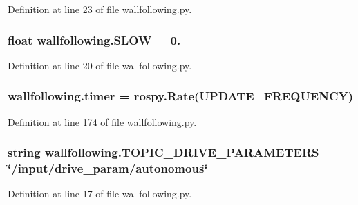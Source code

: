 Definition at line 23 of file wallfollowing.\+py.

\subsubsection[{\texorpdfstring{S\+L\+OW}{SLOW}}]{\setlength{\rightskip}{0pt plus 5cm}float wallfollowing.\+S\+L\+OW = 0.}\hypertarget{namespacewallfollowing_a30a4013dbd3a6ea5275fbed3fe35da22}{}\label{namespacewallfollowing_a30a4013dbd3a6ea5275fbed3fe35da22}


Definition at line 20 of file wallfollowing.\+py.

\subsubsection[{\texorpdfstring{timer}{timer}}]{\setlength{\rightskip}{0pt plus 5cm}wallfollowing.\+timer = rospy.\+Rate({\bf U\+P\+D\+A\+T\+E\+\_\+\+F\+R\+E\+Q\+U\+E\+N\+CY})}\hypertarget{namespacewallfollowing_a57288dd797e0bd15012f3ebf1670ce38}{}\label{namespacewallfollowing_a57288dd797e0bd15012f3ebf1670ce38}


Definition at line 174 of file wallfollowing.\+py.

\subsubsection[{\texorpdfstring{T\+O\+P\+I\+C\+\_\+\+D\+R\+I\+V\+E\+\_\+\+P\+A\+R\+A\+M\+E\+T\+E\+RS}{TOPIC_DRIVE_PARAMETERS}}]{\setlength{\rightskip}{0pt plus 5cm}string wallfollowing.\+T\+O\+P\+I\+C\+\_\+\+D\+R\+I\+V\+E\+\_\+\+P\+A\+R\+A\+M\+E\+T\+E\+RS = \char`\"{}/input/drive\+\_\+param/autonomous\char`\"{}}\hypertarget{namespacewallfollowing_a765ce45df7d0c3d9134fc83534029e36}{}\label{namespacewallfollowing_a765ce45df7d0c3d9134fc83534029e36}


Definition at line 17 of file wallfollowing.\+py.

